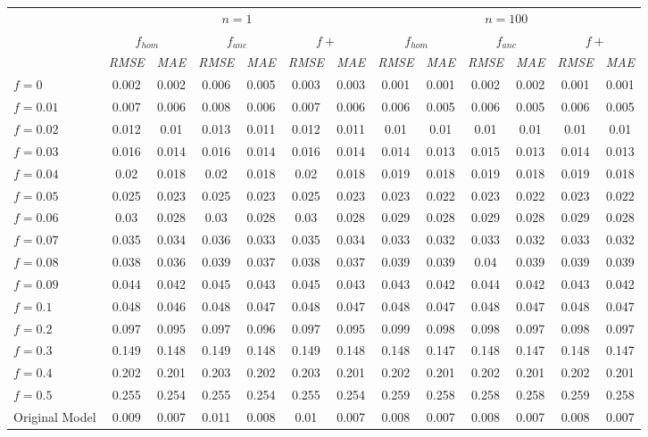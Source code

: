 \begin{tabular}{@{}lcccccccccccc@{}}
\toprule
 & \multicolumn{6}{c}{$n=1$} & \multicolumn{6}{c}{$n=100$} \\
\cmidrule(lr){2-7} \cmidrule(lr){8-13}
 & \multicolumn{2}{c}{$f_{hom}$} & \multicolumn{2}{c}{$f_{anc}$} & \multicolumn{2}{c}{$f+$} & \multicolumn{2}{c}{$f_{hom}$} & \multicolumn{2}{c}{$f_{anc}$} & \multicolumn{2}{c}{$f+$} \\
\cmidrule(lr){2-3} \cmidrule(lr){4-5} \cmidrule(lr){6-7} \cmidrule(lr){8-9} \cmidrule(lr){10-11} \cmidrule(lr){12-13}
 & \textit{RMSE} & \textit{MAE} & \textit{RMSE} & \textit{MAE} & \textit{RMSE} & \textit{MAE} & \textit{RMSE} & \textit{MAE} & \textit{RMSE} & \textit{MAE} & \textit{RMSE} & \textit{MAE} \\
\midrule
$f = 0$ & 0.002 & 0.002 & 0.006 & 0.005 & 0.003 & 0.003 & 0.001 & 0.001 & 0.002 & 0.002 & 0.001 & 0.001 \\
$f = 0.01$ & 0.007 & 0.006 & 0.008 & 0.006 & 0.007 & 0.006 & 0.006 & 0.005 & 0.006 & 0.005 & 0.006 & 0.005 \\
$f = 0.02$ & 0.012 & 0.01 & 0.013 & 0.011 & 0.012 & 0.011 & 0.01 & 0.01 & 0.01 & 0.01 & 0.01 & 0.01 \\
$f = 0.03$ & 0.016 & 0.014 & 0.016 & 0.014 & 0.016 & 0.014 & 0.014 & 0.013 & 0.015 & 0.013 & 0.014 & 0.013 \\
$f = 0.04$ & 0.02 & 0.018 & 0.02 & 0.018 & 0.02 & 0.018 & 0.019 & 0.018 & 0.019 & 0.018 & 0.019 & 0.018 \\
$f = 0.05$ & 0.025 & 0.023 & 0.025 & 0.023 & 0.025 & 0.023 & 0.023 & 0.022 & 0.023 & 0.022 & 0.023 & 0.022 \\
$f = 0.06$ & 0.03 & 0.028 & 0.03 & 0.028 & 0.03 & 0.028 & 0.029 & 0.028 & 0.029 & 0.028 & 0.029 & 0.028 \\
$f = 0.07$ & 0.035 & 0.034 & 0.036 & 0.033 & 0.035 & 0.034 & 0.033 & 0.032 & 0.033 & 0.032 & 0.033 & 0.032 \\
$f = 0.08$ & 0.038 & 0.036 & 0.039 & 0.037 & 0.038 & 0.037 & 0.039 & 0.039 & 0.04 & 0.039 & 0.039 & 0.039 \\
$f = 0.09$ & 0.044 & 0.042 & 0.045 & 0.043 & 0.045 & 0.043 & 0.043 & 0.042 & 0.044 & 0.042 & 0.043 & 0.042 \\
$f = 0.1$ & 0.048 & 0.046 & 0.048 & 0.047 & 0.048 & 0.047 & 0.048 & 0.047 & 0.048 & 0.047 & 0.048 & 0.047 \\
$f = 0.2$ & 0.097 & 0.095 & 0.097 & 0.096 & 0.097 & 0.095 & 0.099 & 0.098 & 0.098 & 0.097 & 0.098 & 0.097 \\
$f = 0.3$ & 0.149 & 0.148 & 0.149 & 0.148 & 0.149 & 0.148 & 0.148 & 0.147 & 0.148 & 0.147 & 0.148 & 0.147 \\
$f = 0.4$ & 0.202 & 0.201 & 0.203 & 0.202 & 0.203 & 0.201 & 0.202 & 0.201 & 0.202 & 0.201 & 0.202 & 0.201 \\
$f = 0.5$ & 0.255 & 0.254 & 0.255 & 0.254 & 0.255 & 0.254 & 0.259 & 0.258 & 0.258 & 0.258 & 0.259 & 0.258 \\
Original Model & 0.009 & 0.007 & 0.011 & 0.008 & 0.01 & 0.007 & 0.008 & 0.007 & 0.008 & 0.007 & 0.008 & 0.007 \\
\bottomrule
\end{tabular}
